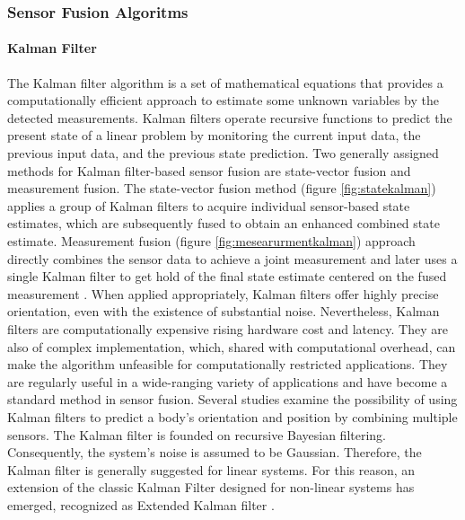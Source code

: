 \subsubsection{Sensor Fusion Algoritms}
\paragraph{Kalman Filter}

The Kalman filter algorithm is a set of mathematical equations that provides a computationally efficient approach to estimate some unknown variables by the detected measurements\cite{welch1995introduction}. Kalman filters operate recursive functions to predict the present state of a linear problem by monitoring the current input data, the previous input data, and the previous state prediction.  Two generally assigned methods for Kalman filter-based sensor fusion are state-vector fusion and measurement fusion. The state-vector fusion method (figure \ref{fig:statekalman}) applies a group of Kalman filters to acquire individual sensor-based state estimates, which are subsequently fused to obtain an enhanced combined state estimate. Measurement fusion (figure \ref{fig:mesearurmentkalman}) approach directly combines the sensor data to achieve a joint measurement and later uses a single Kalman filter to get hold of the final state estimate centered on the fused measurement \cite{mosallaei2007process}.
When applied appropriately, Kalman filters offer highly precise orientation, even with the existence of substantial noise. Nevertheless, Kalman filters are computationally expensive rising hardware cost and latency. They are also of complex implementation, which, shared with computational overhead, can make the algorithm unfeasible for computationally restricted applications. They are regularly useful in a wide-ranging variety of applications and have become a standard method in sensor fusion. Several studies examine the possibility of using Kalman filters to predict a body’s orientation and position by combining multiple sensors. The Kalman filter is founded on recursive Bayesian filtering.
Consequently, the system’s noise is assumed to be Gaussian. Therefore, the Kalman filter is generally suggested for linear systems. For this reason, an extension of the classic Kalman Filter designed for non-linear systems has emerged, recognized as Extended Kalman filter \cite{wilson2019formulation}.


